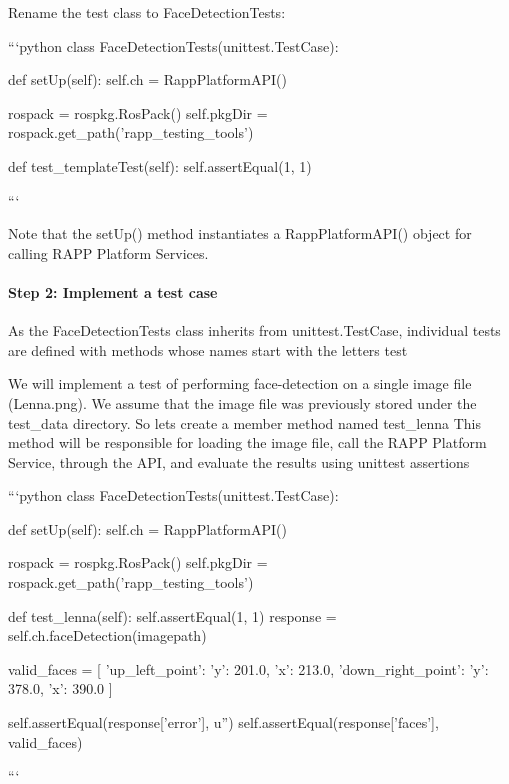 Rename the test class to {\ttfamily Face\-Detection\-Tests}\-:

```python class Face\-Detection\-Tests(unittest.\-Test\-Case)\-: \begin{DoxyVerb}def setUp(self):
    self.ch = RappPlatformAPI()

    rospack = rospkg.RosPack()
    self.pkgDir = rospack.get_path('rapp_testing_tools')

def test_templateTest(self):
    self.assertEqual(1, 1)
\end{DoxyVerb}


```

Note that the {\ttfamily set\-Up()} method instantiates a Rapp\-Platform\-A\-P\-I() object for calling R\-A\-P\-P Platform Services.

\paragraph*{Step 2\-: Implement a test case}

As the {\ttfamily Face\-Detection\-Tests} class inherits from {\ttfamily unittest.\-Test\-Case}, individual tests are defined with methods whose names start with the letters {\ttfamily test}

We will implement a test of performing face-\/detection on a single image file (Lenna.\-png). We assume that the image file was previously stored under the {\ttfamily test\-\_\-data} directory. So lets create a member method named {\ttfamily test\-\_\-lenna} This method will be responsible for loading the image file, call the R\-A\-P\-P Platform Service, through the A\-P\-I, and evaluate the results using {\ttfamily unittest} assertions

```python class Face\-Detection\-Tests(unittest.\-Test\-Case)\-: \begin{DoxyVerb}def setUp(self):
    self.ch = RappPlatformAPI()

    rospack = rospkg.RosPack()
    self.pkgDir = rospack.get_path('rapp_testing_tools')

def test_lenna(self):
    self.assertEqual(1, 1)
    response = self.ch.faceDetection(imagepath)

    valid_faces = [{
        'up_left_point': {'y': 201.0, 'x': 213.0},
        'down_right_point': {'y': 378.0, 'x': 390.0}
    }]

    self.assertEqual(response['error'], u'')
    self.assertEqual(response['faces'], valid_faces)
\end{DoxyVerb}
 ```

